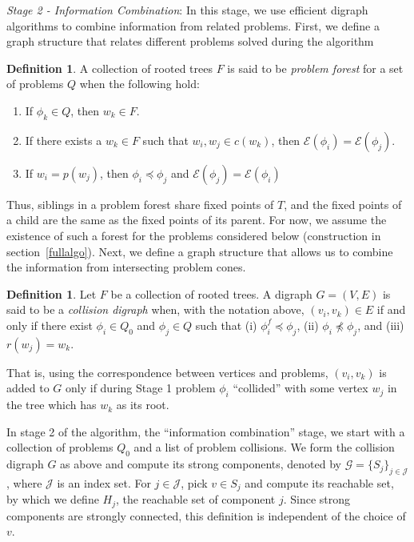 \documentclass[11pt,reqno]{amsart}
\theoremstyle{definition}
\newtheorem{defn}[thm]{Definition}
\numberwithin{equation}{section}
\newcommand{\pre}{\phi}
\newcommand{\fix}{\mathcal{E}}
\newcommand{\peq}{\preceq}
\newcommand{\strongc}{\mathcal{G}}
\newcommand{\strongcomp}{S}
\newcommand{\acto}{Q_0}
\newcommand{\act}{Q}
\newcommand{\pref}{\pre^{f}}
\newcommand{\reach}{H}
\newcommand{\forest}{F}
\begin{document}
\emph{Stage 2 - Information Combination}: In this stage, we use efficient digraph algorithms to combine information from related problems.
First, we define a graph structure that relates different problems solved during the algorithm
\begin{defn} \label{def:forest}
A collection of rooted trees $\forest$ is said to be \emph{problem forest} for a set of problems $\act$ when the following hold:

\begin{enumerate}
\item If $\pre_k \in Q$, then $w_k \in \forest$. \label{def:forest1}
\item If there exists a $w_k \in F$ such that $w_i, w_j \in c(w_k)$, then $\fix(\pre_i) = \fix(\pre_j)$. \label{def:forest2}
\item If $w_i = p(w_j)$, then $\pre_i \peq \pre_j$ and $\fix(\pre_j) = \fix(\pre_i)$ \label{def:forest3} 
\end{enumerate} 

\end{defn}

Thus, siblings in a problem forest share fixed points of $T$, and the fixed points of a child are the same as the fixed points of its parent. 
For now, we assume the existence of such a forest for the problems considered below (construction in section~\ref{fullalgo}). Next, we define a graph structure that allows us to combine the information from intersecting problem cones.

\begin{defn} \label{def:graph}
Let $\forest$ be a collection of rooted trees. A digraph $G = (V,E)$ is said to be a \emph{collision digraph} when, with the notation above, $(v_i,v_k) \in E$ if and only if there exist $\pre_i \in \acto$ and $\pre_j \in \act$ such that (i) $\pref_i \peq \pre_j$, (ii) $\pre_i \not \peq \pre_j$, and (iii) $r(w_j) = w_k$.
\end{defn}

That is, using the correspondence between vertices and problems, $(v_i,v_k)$ is added to $G$ only if during Stage 1 problem $\pre_i$ ``collided'' with some vertex $w_j$ in the tree which has $w_k$ as its root.  

In stage 2 of the algorithm, the ``information combination'' stage, we start with a collection of problems $\acto$ and a list of problem collisions. We form the collision digraph $G$ as above and compute its strong components, denoted by $\strongc = \{\strongcomp_j\}_{j\in \mathcal{J}}$, where $\mathcal{J}$ is an index set. 
For $j \in \mathcal{J}$, pick $v \in \strongcomp_j$ and compute its reachable set, by which we define $\reach_j$, the reachable set of component $j$. 
Since strong components are strongly connected, this definition is independent of the choice of $v$. 
\end{document}

